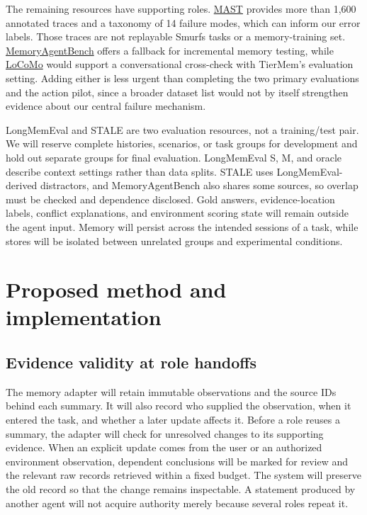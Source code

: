 \documentclass[a4paper,11pt]{article}
\begin{document}
The remaining resources have supporting roles. \href{https://github.com/multi-agent-systems-failure-taxonomy/MAST}{MAST} \cite{mast2025} provides more than 1,600 annotated traces and a taxonomy of 14 failure modes, which can inform our error labels. Those traces are not replayable Smurfs tasks or a memory-training set. \href{https://github.com/HUST-AI-HYZ/MemoryAgentBench}{MemoryAgentBench} \cite{memoryagentbench2026} offers a fallback for incremental memory testing, while \href{https://github.com/snap-research/locomo}{LoCoMo} \cite{locomo2024} would support a conversational cross-check with TierMem's evaluation setting. Adding either is less urgent than completing the two primary evaluations and the action pilot, since a broader dataset list would not by itself strengthen evidence about our central failure mechanism.\par

LongMemEval and STALE are two evaluation resources, not a training/test pair. We will reserve complete histories, scenarios, or task groups for development and hold out separate groups for final evaluation. LongMemEval S, M, and oracle describe context settings rather than data splits. STALE uses LongMemEval-derived distractors, and MemoryAgentBench also shares some sources, so overlap must be checked and dependence disclosed. Gold answers, evidence-location labels, conflict explanations, and environment scoring state will remain outside the agent input. Memory will persist across the intended sessions of a task, while stores will be isolated between unrelated groups and experimental conditions.\par

\clearpage
\section{Proposed method and implementation}
\subsection{Evidence validity at role handoffs}
The memory adapter will retain immutable observations and the source IDs behind each summary. It will also record who supplied the observation, when it entered the task, and whether a later update affects it. Before a role reuses a summary, the adapter will check for unresolved changes to its supporting evidence. When an explicit update comes from the user or an authorized environment observation, dependent conclusions will be marked for review and the relevant raw records retrieved within a fixed budget. The system will preserve the old record so that the change remains inspectable. A statement produced by another agent will not acquire authority merely because several roles repeat it.\par
\end{document}
